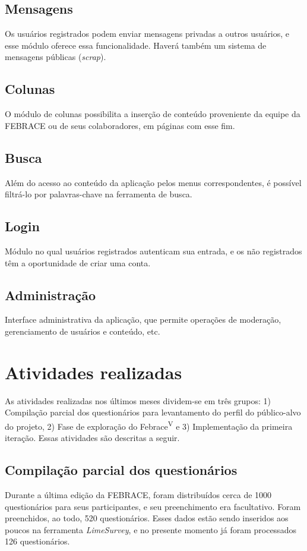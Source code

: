 \documentclass[a4paper,12pt,font=plain,header=plain]{abnt}
\begin{document}
		\section{Mensagens}
		Os usuários registrados podem enviar mensagens privadas a outros usuários, e esse módulo oferece essa funcionalidade. Haverá também um sistema de mensagens públicas (\textit{scrap}).

		\section{Colunas}
		O módulo de colunas possibilita a inserção de conteúdo proveniente da equipe da FEBRACE ou de seus colaboradores, em páginas com esse fim.

		\section{Busca}
		Além do acesso ao conteúdo da aplicação pelos menus correspondentes, é possível filtrá-lo por palavras-chave na ferramenta de busca.

		\section{Login}
		Módulo no qual usuários registrados autenticam sua entrada, e os não registrados têm a oportunidade de criar uma conta.

		\section{Administração}
		Interface administrativa da aplicação, que permite operações de moderação, gerenciamento de usuários e conteúdo, etc.

\chapter{Atividades realizadas}
  As atividades realizadas nos últimos meses dividem-se em três grupos: 1) Compilação parcial dos questionários para levantamento do perfil do público-alvo do projeto, 2) Fase de exploração do Febrace\textsuperscript{V} e 3) Implementação da primeira iteração. Essas atividades são descritas a seguir.

  \section{Compilação parcial dos questionários}
    Durante a última edição da FEBRACE, foram distribuídos cerca de 1000 questionários para seus participantes, e seu preenchimento era facultativo. Foram preenchidos, ao todo, 520 questionários. Esses dados estão sendo inseridos aos poucos na ferramenta \textit{LimeSurvey}, e no presente momento já foram processados 126 questionários.
\end{document}
